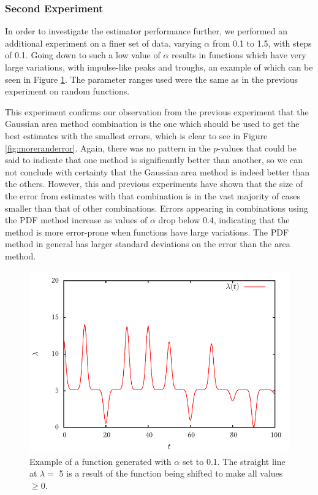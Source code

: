 \documentclass[a4paper,11pt]{article}
\begin{document}
\subsubsection{Second Experiment}
\label{sec-7-2-2}

In order to investigate the estimator performance further, we performed an
additional experiment on a finer set of data, varying $\alpha$ from 0.1 to 1.5,
with steps of 0.1. Going down to such a low value of $\alpha$ results in
functions which have very large variations, with impulse-like peaks and troughs,
an example of which can be seen in Figure \ref{fig:smallalpha}. The parameter
ranges used were the same as in the previous experiment on random functions.

This experiment confirms our observation from the previous experiment that the
Gaussian area method combination is the one which should be used to get the best
estimates with the smallest errors, which is clear to see in Figure
\ref{fig:moreranderror}. Again, there was no pattern in the $p$-values that
could be said to indicate that one method is significantly better than another,
so we can not conclude with certainty that the Gaussian area method is indeed
better than the others. However, this and previous experiments have shown that
the size of the error from estimates with that combination is in the vast
majority of cases smaller than that of other combinations. Errors appearing in
combinations using the PDF method increase as values of $\alpha$ drop below 0.4,
indicating that the method is more error-prone when functions have large
variations. The PDF method in general has larger standard deviations on the
error than the area method.
\begin{center}
\begin{figure}
\includegraphics{smallalpha}
\caption{Example of a function generated with $\alpha$ set to 0.1. The straight
line at $\lambda=$ 5 is a result of the function being shifted to make all values
$\geq 0$.}
\label{fig:smallalpha}
\end{figure}
\end{center}
\end{document}
